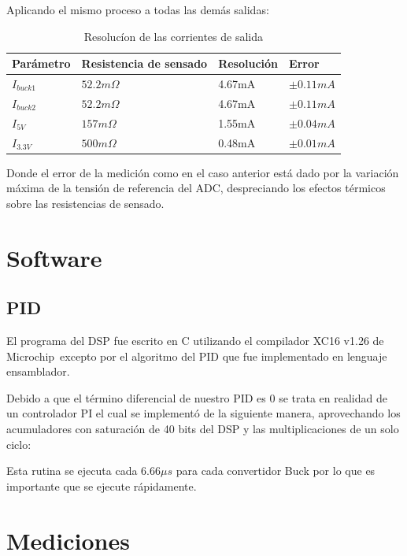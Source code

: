 \documentclass[12pt]{report}
\begin{document}
Aplicando el mismo proceso a todas las demás salidas:

\begin{table}[H]
	\centering
	\begin{tabular}{M{2cm}M{5cm}M{3cm}M{3cm}} \toprule
		Parámetro & Resistencia de sensado & Resolución & Error 
		\\ \midrule
		$I_{buck1}$ & $52.2m\Omega$ & 4.67mA & $\pm0.11mA$ \\
		$I_{buck2}$ & $52.2m\Omega$ & 4.67mA & $\pm0.11mA$ \\
		$I_{5V}$ & $157m\Omega$ & 1.55mA & $\pm0.04mA$ \\
		$I_{3.3V}$ & $500m\Omega$ & 0.48mA & $\pm0.01mA$ \\
		\bottomrule
	\end{tabular}
	\caption{Resolucíon de las corrientes de salida}
\end{table}

Donde el error de la medición como en el caso anterior está dado por la variación máxima de la tensión de referencia del ADC, despreciando los efectos térmicos sobre las resistencias de sensado.

\chapter{Software}

\section{PID}

El programa del DSP fue escrito en C utilizando el compilador XC16 v1.26 de Microchip\textregistered \ excepto por el algoritmo del PID que fue implementado en lenguaje ensamblador. 

Debido a que el término diferencial de nuestro PID es 0 se trata en realidad de un controlador PI el cual se implementó de la siguiente manera, aprovechando los acumuladores con saturación de 40 bits del DSP y las multiplicaciones de un solo ciclo:



Esta rutina se ejecuta cada $6.66\mu s$ para cada convertidor Buck por lo que es importante que se ejecute rápidamente.

\chapter{Mediciones}
\end{document}
